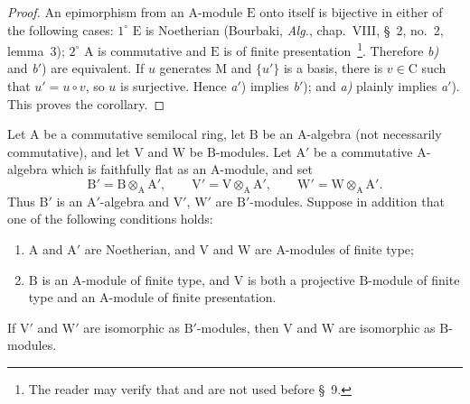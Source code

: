 \begin{proof}
An epimorphism from an $\mathrm{A}$-module $\mathrm{E}$ onto itself is
bijective in either of the following cases: \(1^\circ\) $\mathrm{E}$ is
Noetherian (Bourbaki, \emph{Alg.}, chap.~VIII, \S~2, no.~2, lemma~3);
\(2^\circ\) $\mathrm{A}$ is commutative and $\mathrm{E}$ is of finite
presentation~\footnote{The reader may verify that
 and  are not used before \S~9.}.
Therefore \emph{b)} and \emph{b}$'$) are equivalent. If $u$ generates
$\mathrm{M}$ and $\{u'\}$ is a basis, there is $v\in\mathrm{C}$ such
that $u'=u\circ v$, so $u$ is surjective. Hence \emph{a}$'$) implies
\emph{b}$'$); and \emph{a)} plainly implies \emph{a}$'$). This proves
the corollary.
\end{proof}


\begin{proposition}[2.5.8]
\label{IV.2.5.8}
Let $\mathrm{A}$ be a commutative semilocal ring, let $\mathrm{B}$ be an
$\mathrm{A}$-algebra \textnormal{(}not necessarily
commutative\textnormal{)}, and let $\mathrm{V}$ and $\mathrm{W}$ be
$\mathrm{B}$-modules. Let $\mathrm{A}'$ be a commutative
$\mathrm{A}$-algebra which is faithfully flat as an $\mathrm{A}$-module,
and set
\[
  \mathrm{B}'=\mathrm{B}\otimes_{\mathrm{A}}\mathrm{A}',\qquad
  \mathrm{V}'=\mathrm{V}\otimes_{\mathrm{A}}\mathrm{A}',\qquad
  \mathrm{W}'=\mathrm{W}\otimes_{\mathrm{A}}\mathrm{A}'.
\]
Thus $\mathrm{B}'$ is an $\mathrm{A}'$-algebra and $\mathrm{V}'$,
$\mathrm{W}'$ are $\mathrm{B}'$-modules. Suppose in addition that one of
the following conditions holds:
\begin{enumerate}
  \item[(i)] $\mathrm{A}$ and $\mathrm{A}'$ are Noetherian, and
  $\mathrm{V}$ and $\mathrm{W}$ are $\mathrm{A}$-modules of finite type;
  \item[(ii)] $\mathrm{B}$ is an $\mathrm{A}$-module of finite type, and
  $\mathrm{V}$ is both a projective $\mathrm{B}$-module of finite type
  and an $\mathrm{A}$-module of finite presentation.
\end{enumerate}
If $\mathrm{V}'$ and $\mathrm{W}'$ are isomorphic as
$\mathrm{B}'$-modules, then $\mathrm{V}$ and $\mathrm{W}$ are isomorphic
as $\mathrm{B}$-modules.
\end{proposition}

